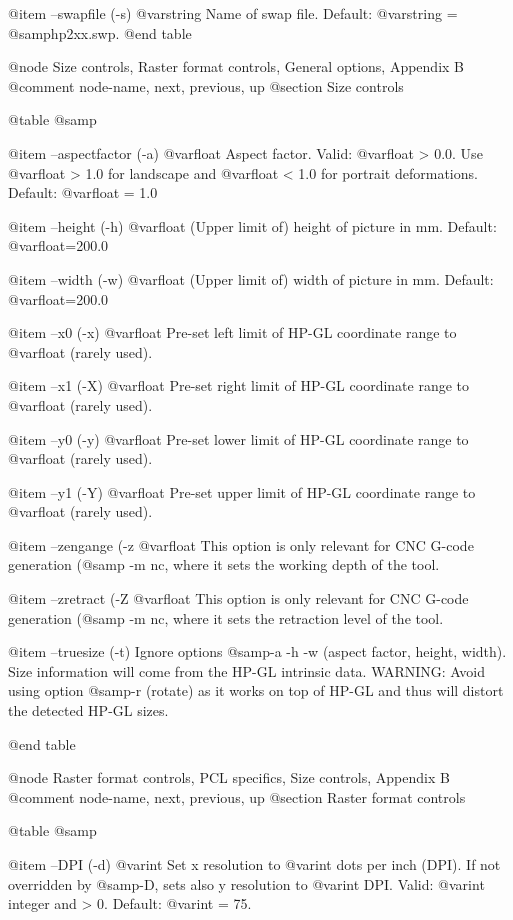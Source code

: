 @item --swapfile (-s) @var{string}
Name of swap file. Default: @var{string} = @samp{hp2xx.swp}.
@end table



@node Size controls, Raster format controls, General options, Appendix B
@comment  node-name,  next,  previous,  up
@section Size controls

@table @samp

@item --aspectfactor (-a) @var{float}
Aspect factor. Valid: @var{float} > 0.0. Use @var{float} > 1.0 for landscape
and @var{float} < 1.0 for portrait deformations. Default: @var{float} = 1.0

@item --height (-h) @var{float}
(Upper limit of) height of picture in mm. Default: @var{float}=200.0

@item --width (-w) @var{float}
(Upper limit of) width of picture in mm. Default: @var{float}=200.0

@item --x0 (-x) @var{float}
Pre-set left limit of HP-GL coordinate range to @var{float} (rarely used).

@item --x1 (-X) @var{float}
Pre-set right limit of HP-GL coordinate range to @var{float} (rarely used).

@item --y0 (-y) @var{float}
Pre-set lower limit of HP-GL coordinate range to @var{float} (rarely used).

@item --y1 (-Y) @var{float}
Pre-set upper limit of HP-GL coordinate range to @var{float} (rarely used).

@item --zengange (-z @var{float}
This option is only relevant for CNC G-code generation (@samp{ -m nc}, where
it sets the working depth of the tool.

@item --zretract (-Z @var{float}
This option is only relevant for CNC G-code generation (@samp{ -m nc}, where
it sets the retraction level of the tool.

@item --truesize (-t)
Ignore options @samp{-a -h -w} (aspect factor, height, width). Size information
will come from the HP-GL intrinsic data. WARNING: Avoid using option @samp{-r}
(rotate) as it works on top of HP-GL and thus will distort the detected HP-GL
sizes.

@end table



@node Raster format controls, PCL specifics, Size controls, Appendix B
@comment  node-name,  next,  previous,  up
@section  Raster format controls

@table @samp

@item --DPI (-d) @var{int}
Set x resolution to @var{int} dots per inch (DPI). If not overridden
by @samp{-D}, sets also y resolution to @var{int} DPI.
Valid: @var{int} integer and > 0. Default: @var{int} = 75.


